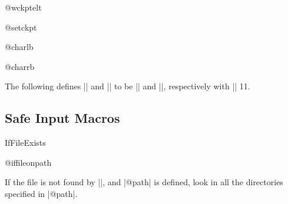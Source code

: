 \begin{multicols}
 \begin{docCmd}{@wckptelt}{}
 \end{docCmd}
    \begin{teX}
\def\@wckptelt#1{%
  \immediate\write\@partaux{%
    \string\setcounter{#1}{\the\@nameuse{c@#1}}}}
    \end{teX}


 \begin{docCmd}{@setckpt}{}
 \end{docCmd}
    \begin{teX}
\def\@setckpt#1{\global\@namedef{cp@#1}}
    \end{teX}


 \begin{docCmd}{@charlb}{}
 \begin{docCmd}{@charrb}{}
 \end{docCmd}
 \end{docCmd}
 The following defines |\@charlb| and |\@charrb| to be |{| and |}|,
 respectively with |\catcode| 11.
    \begin{teX}
{\catcode`[=1 \catcode`]=2
\catcode`{=11 \catcode`}=11
\gdef\@charlb[{]
\gdef\@charrb[}]
]%
    \end{teX}


 \subsection{Safe Input Macros}

 \begin{docCmd}{IfFileExists}{}
 \end{docCmd}

 \begin{teX}
\long{}
 \end{teX}


 \begin{docCmd}{@iffileonpath}{}
 \end{docCmd}
 If the file is not found by |\openin|, and |@path| is defined,
 look in all the directories specified in |@path|.

    \begin{teX}
\long\def\@iffileonpath#1{%
  \let\reserved@a\@secondoftwo
  \expandafter\@tfor\expandafter\reserved@b\expandafter
             :\expandafter=@path\do{%
    \openin\@inputcheck\reserved@b#1 %
    \ifeof\@inputcheck\else
      \edef\@filef@und{\reserved@b#1 }%
      \let\reserved@a\@firstoftwo%
      \closein\@inputcheck
      \@break@tfor
    \fi}%
  \reserved@a}
    \end{teX}



\end{multicols}
